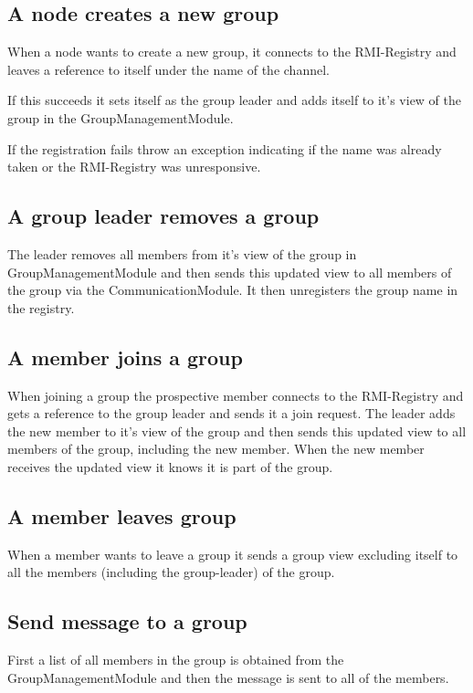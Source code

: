 \documentclass[english]{article}
\begin{document}
\subsection{A node creates a new group}
When a node wants to create a new group, it connects to the RMI-Registry and leaves a reference to itself under the name of the channel.

If this succeeds it sets itself as the group leader and adds itself to it's view of the group in the GroupManagementModule.

If the registration fails throw an exception indicating if the name was already taken or the RMI-Registry was unresponsive.

\subsection{A group leader removes a group}
The leader removes all members from it's view of the group in GroupManagementModule and then sends this updated view to all members of the group via the CommunicationModule. It then unregisters the group name in the registry.

\subsection{A member joins a group}
When joining a group the prospective member connects to the RMI-Registry and gets a reference to the group leader and sends it a join request. The leader adds the new member to it's view of the group and then sends this updated view to all members of the group, including the new member. When the new member receives the updated view it knows it is part of the group.

\subsection{A member leaves group}
When a member wants to leave a group it sends a group view excluding itself to all the members (including the group-leader) of the group.

\subsection{Send message to a group}
First a list of all members in the group is obtained from the GroupManagementModule and then the message is sent to all of the members.

\end{document}
